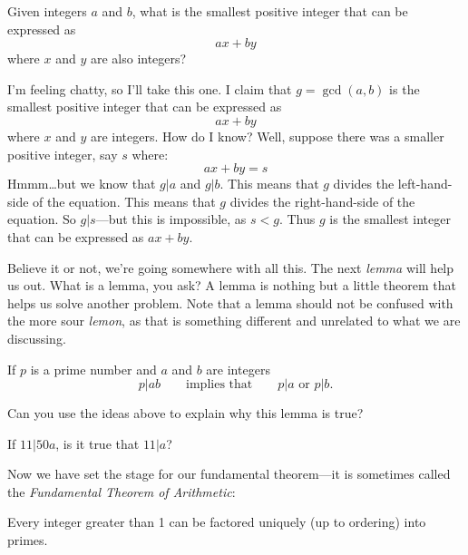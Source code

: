 \begin{question} 
Given integers $a$ and $b$, what is the smallest positive integer that
can be expressed as
\[
ax + by
\]
where $x$ and $y$ are also integers?
\end{question}

I'm feeling chatty, so I'll take this one. I claim that $g =
\gcd(a,b)$ is the smallest positive integer that can be
expressed as
\[
ax + by
\]
where $x$ and $y$ are integers. How do I know? Well, suppose there was
a smaller positive integer, say $s$ where:
\[
ax + by = s
\]
Hmmm\dots but we know that $g|a$ and $g|b$. This means that $g$
divides the left-hand-side of the equation. This means that $g$
divides the right-hand-side of the equation. So $g|s$---but this is
impossible, as $s< g$. Thus $g$ is the smallest integer that can be
expressed as $ax +by$.


Believe it or not, we're going somewhere with all this. The next
\textit{lemma} will help us out.  What is a lemma, you
ask? A lemma is nothing but a little theorem that helps us solve
another problem. Note that a lemma should not be confused with the
more sour \textit{lemon}, as that is something
different and unrelated to what we are discussing.

\begin{lemma} 
If $p$ is a prime number and $a$ and $b$ are integers
\[
p|ab \qquad\text{implies that} \qquad p | a\text{ or } p|b.
\]
\end{lemma}

\begin{question} Can you use the ideas above to explain why this lemma is true?
\end{question}
\QM



\begin{question} If $11 | 50a$, is it true that $11|a$?
\end{question}
\QM




Now we have set the stage for our fundamental theorem---it is
sometimes called the \textit{Fundamental Theorem of Arithmetic}:


\begin{theorem}
Every integer greater than 1 can be factored uniquely (up to ordering)
into primes.
\end{theorem}

